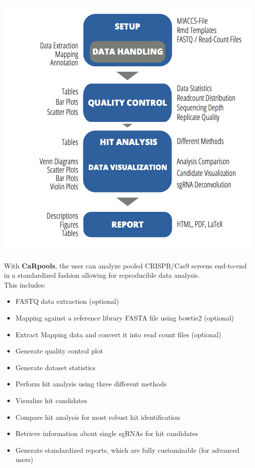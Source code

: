 \documentclass[]{article}
\providecommand{\tightlist}{%
  \setlength{\itemsep}{0pt}\setlength{\parskip}{0pt}}
\begin{document}
\includegraphics{./pictures/workflow.png}

With \textbf{CaRpools}, the user can analyze pooled CRISPR/Cas9 screens
end-to-end in a standardized fashion allowing for reproducible data
analysis.\\
This includes:

\begin{itemize}
\tightlist
\item
  FASTQ data extraction (optional)
\item
  Mapping against a reference library FASTA file using bowtie2
  (optional)
\item
  Extract Mapping data and convert it into read count files (optional)
\item
  Generate quality control plot
\item
  Generate dataset statistics
\item
  Perform hit analysis using three different methods
\item
  Visualize hit candidates
\item
  Compare hit analysis for most robust hit identification
\item
  Retrieve information about single sgRNAs for hit candidates
\item
  Generate standardized reports, which are fully customizable (for
  advanced users)
\end{itemize}
\end{document}
